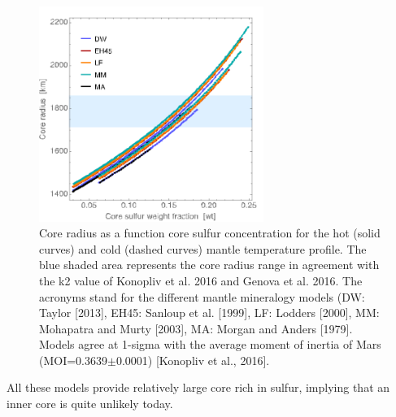 \begin{figure}[h!]
\begin{center}
\includegraphics[width=0.65\textwidth]
{figures/Figsulfur.png}
\caption{Core radius as a function core sulfur concentration for the hot (solid curves) and cold (dashed curves) mantle temperature profile.  The blue shaded area represents the core radius range in agreement with the k2 value of Konopliv et al. 2016 and Genova et al. 2016. The acronyms stand for the different mantle mineralogy models (DW: Taylor [2013], EH45: Sanloup et al. [1999], LF: Lodders [2000], MM: Mohapatra and Murty [2003], MA: Morgan and Anders [1979]. Models agree at 1-sigma with the average moment of inertia of Mars (MOI=0.3639$\pm$0.0001) [Konopliv et al., 2016].}
\label{fig:Figsulfur.png} 
\end{center}
\end{figure}
All these models provide relatively large core rich in sulfur, implying that an inner core is quite unlikely today.


